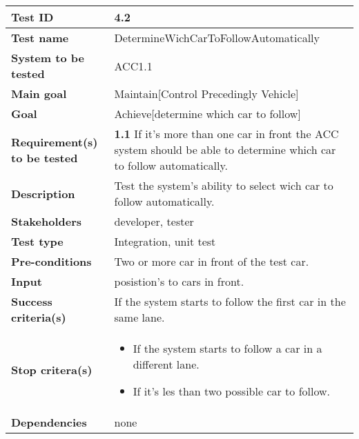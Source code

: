 	\begin{table}[H]
		\begin{tabular}{| p{4cm} | p{10cm} |}
			\hline
			\rowcolor{gray}
			{\bf Test ID} & 4.2 \\ \hline
			{\bf Test name} & DetermineWichCarToFollowAutomatically \\ \hline
			{\bf System to be tested} & ACC1.1\\ \hline
			{\bf Main goal} & Maintain[Control Precedingly Vehicle] \\ \hline
			{\bf Goal} & Achieve[determine which car to follow]
			\\ \hline
			{\bf Requirement(s) to be tested} & {\bf 1.1} If it’s more than one car 
			in front the ACC system should be able to determine which car to follow 
			automatically.\\ \hline
			{\bf Description} & Test the system’s ability to select wich car to 
			follow automatically.\\ \hline
			{\bf Stakeholders} & developer, tester\\ \hline
			{\bf Test type} &  Integration, unit test \\ \hline
			{\bf Pre-conditions} & Two or more car in front of the test car. \\ \hline
			{\bf Input} & posistion’s to cars in front. \\ \hline
			{\bf Success criteria(s)} & If the system starts to follow the first car 
			in the same lane.\\ \hline
			{\bf Stop critera(s)} &  
				\begin{itemize}
					\item If the system starts to follow a car in a different lane.
					\item If it’s les than two possible car to follow. 
				\end{itemize}\\ \hline
			{\bf Dependencies} & none\\ \hline
		\end{tabular}
	\end{table}
	
